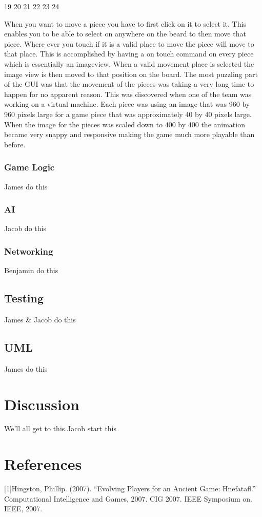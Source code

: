 \documentclass{article}
\begin{document}
              19
        20 21 22 23 24

	When you want to move a piece you have to first click on it to select it. This enables you to be able to select on anywhere on the beard to then move that piece. Where ever you touch if it is a valid place to move the piece will move to that place. This is accomplished by having a on touch command on every piece which is essentially an imageview. When a valid movement place is selected the image view is then moved to that position on the board. The most puzzling part of the GUI was that the movement of the pieces was taking a very long time to happen for no apparent reason. This was discovered when one of the team was working on a virtual machine. Each piece was using an image that was 960 by 960 pixels large for a game piece that was approximately 40 by 40 pixels large. When the image for the pieces was scaled down to 400 by 400 the animation became very snappy and responsive making the game much more playable than before. 

\subsubsection{Game Logic}
James do this

\subsubsection{AI}
Jacob do this

\subsubsection{Networking}
Benjamin do this

\subsection{Testing}
James \& Jacob do this

\subsection{UML}
James do this

\section{Discussion}
We'll all get to this
Jacob start this

\section{References}
[1]Hingston, Phillip. (2007). “Evolving Players for an Ancient Game: Hnefatafl.” Computational Intelligence and Games, 2007. CIG 2007. IEEE Symposium on. IEEE, 2007.
\end{document}
